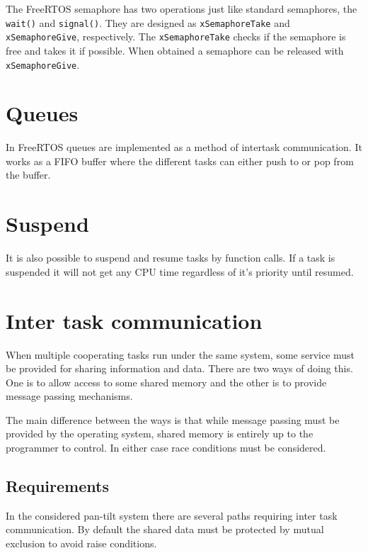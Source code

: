 The FreeRTOS semaphore has two operations just like standard semaphores, the \texttt{wait()} and \texttt{signal()}. They are designed as \texttt{xSemaphoreTake} and \texttt{xSemaphoreGive}, respectively. The \texttt{xSemaphoreTake} checks if the semaphore is free and takes it if possible.
When obtained a semaphore can be released with \texttt{xSemaphoreGive}.

\section{Queues}
In FreeRTOS queues are implemented as a method of intertask communication. It works as a FIFO buffer where the different tasks can either push to or pop from the buffer.

\section{ Suspend }
It is also possible to suspend and resume tasks by function calls. If a task is suspended it will not get any CPU time regardless of it's priority until resumed.

%
%

\section{Inter task communication}
When multiple cooperating tasks run under the same system, some service must be
provided for sharing information and data. There are two ways of doing this. One
is to allow access to some shared memory and the other is to provide message
passing mechanisms.

The main difference between the ways is that while message passing must be
provided by the operating system, shared memory is entirely up to the programmer
to control. In either case race conditions must be considered.

\subsection{Requirements}
In the considered pan-tilt system there are several paths requiring inter task
communication. By default the shared data must be protected by mutual exclusion
to avoid raise conditions. 

